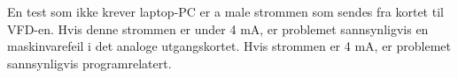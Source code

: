 En test som ikke krever laptop-PC er a male strommen som sendes fra kortet til VFD-en.  Hvis denne strommen er under 4 mA, er problemet sannsynligvis en maskinvarefeil i det analoge utgangskortet.  Hvis strommen er 4 mA, er problemet sannsynligvis programrelatert.




